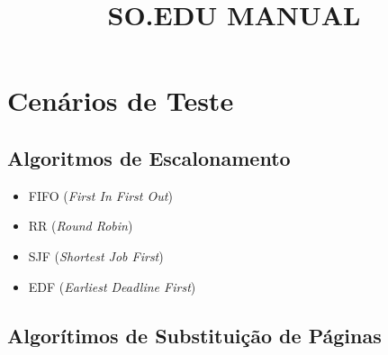 \documentclass{article}
\begin{document}
\title{SO.EDU MANUAL}

\maketitle


\section{Cenários de Teste}


\subsection{Algoritmos de Escalonamento}

\begin{itemize}
	\item FIFO (\textit{First In First Out})
	\item RR (\textit{Round Robin})
	\item SJF (\textit{Shortest Job First})
	\item EDF (\textit{Earliest Deadline First})
\end{itemize}

\subsection{Algorítimos de Substituição de Páginas}
\end{document}
